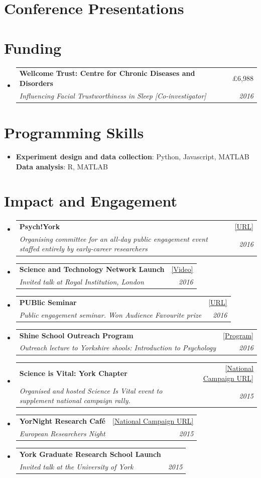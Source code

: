 \documentclass[letterpaper,11pt]{article}
\makeatletter
\newcommand{\resumeSubheading}[4]{
  \vspace{-1pt}\item
    \begin{tabular*}{0.97\textwidth}{l@{\extracolsep{\fill}}r}
      \textbf{#1} & #2 \\
      \textit{\small#3} & \textit{\small #4} \\
    \end{tabular*}\vspace{-5pt}
}
\newcommand{\resumeSubHeadingListStart}{\begin{itemize}[label = {},leftmargin=*]}
\newcommand{\resumeSubHeadingListEnd}{\end{itemize}}
\makeatother
\begin{document}
\printbibliography[type=misc,heading=none,env=bibenv]

\section{Conference Presentations}
\printbibliography[type=unpublished,heading=none,env=bibenv]

\section{Funding}
  \resumeSubHeadingListStart
    \resumeSubheading
      {Wellcome Trust: Centre for Chronic Diseases and Disorders}{£6,988}
      {Influencing Facial Trustworthiness in Sleep [Co-investigator]}{2016}
  \resumeSubHeadingListEnd

\section{Programming Skills}
 \resumeSubHeadingListStart
   \item{
     \textbf{Experiment design and data collection}{: Python, Javascript, MATLAB }
     \hfill
     \textbf{Data analysis}{: R, MATLAB }
   }
 \resumeSubHeadingListEnd

\section{Impact and Engagement}
  \resumeSubHeadingListStart
    \resumeSubheading
      {Psych!York}{\href{http://yorkfestivalofideas.com/2016/community-events/psych-york-interactive-family-fun/}{[URL]}}
      {Organising committee for an all-day public engagement event staffed entirely by early-career researchers}{2016}
    \resumeSubheading
      {Science and Technology Network Launch}{\href{https://www.youtube.com/watch?v=4FbHqlDctqA}{[Video]}}
      {Invited talk at Royal Institution, London}{2016}
     \resumeSubheading
      {PUBlic Seminar}{\href{https://www.york.ac.uk/news-and-events/events/public-lectures/summer-2016/pub-seminar/}{[URL]}}
      {Public engagement seminar. Won Audience Favourite prize}{2016}
     \resumeSubheading
      {Shine School Outreach Program}{\href{https://www.york.ac.uk/study/undergraduate/outreach/shine}{[Program]}}
      {Outreach lecture to Yorkshire shools: Introduction to Psychology}{2016}
     \resumeSubheading
      {Science is Vital: York Chapter}{\href{http://scienceisvital.org.uk/as-vital-as-ever/around-the-uk/}{[National Campaign URL]}}
      {Organised and hosted Science Is Vital event to supplement national campaign rally.}{2015}
      \resumeSubheading
      {YorNight Research Caf{\'e}}{\href{https://www.york.ac.uk/staff/external-relations/outreach/events/yornight/}{[National Campaign URL]}}
      {European Researchers Night}{2015}
      \resumeSubheading
      {York Graduate Research School Launch}{}
      {Invited talk at the University of York}{2015}
  \resumeSubHeadingListEnd
  
\end{document}
